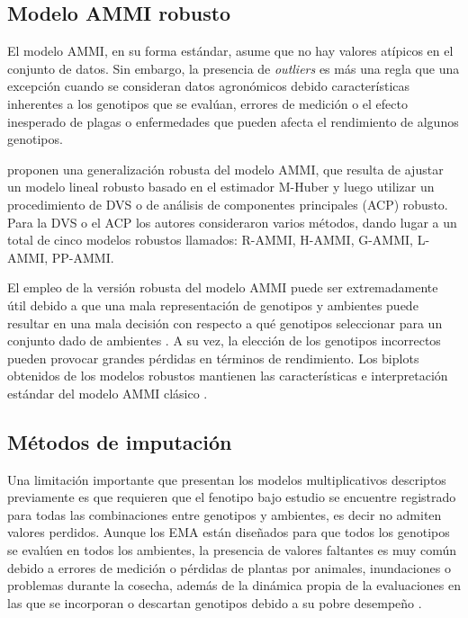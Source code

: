 \subsection{Modelo AMMI robusto}

El modelo AMMI, en su forma estándar, asume que no hay valores atípicos en el conjunto de datos. Sin embargo, la presencia de \emph{outliers} es más una regla que una excepción cuando se consideran datos agronómicos debido características inherentes a los genotipos que se evalúan, errores de medición o el efecto inesperado de plagas o enfermedades que pueden afecta el rendimiento de algunos genotipos.

\citet{Rodriguesetal2016} proponen una generalización robusta del modelo AMMI, que resulta de ajustar un modelo lineal robusto basado en el estimador M-Huber \citep{Huber1981} y luego utilizar un procedimiento de DVS o de análisis de componentes principales (ACP) robusto. Para la DVS o el ACP los autores consideraron varios métodos, dando lugar a un total de cinco modelos robustos llamados: R-AMMI, H-AMMI, G-AMMI, L-AMMI, PP-AMMI. 

El empleo de la versión robusta del modelo AMMI puede ser extremadamente útil debido a que una mala representación de genotipos y ambientes puede resultar en una mala decisión con respecto a qué genotipos seleccionar para un conjunto dado de ambientes \citep{GauchZobel1997, Yanetal2000}. A su vez, la elección de los genotipos incorrectos pueden provocar grandes pérdidas en términos de rendimiento. Los biplots obtenidos de los modelos robustos mantienen las características e interpretación estándar del modelo AMMI clásico \citep{Rodriguesetal2016}.


\subsection{Métodos de imputación}


Una limitación importante que presentan los modelos multiplicativos descriptos previamente es que requieren que el fenotipo bajo estudio se encuentre registrado para todas las combinaciones entre genotipos y ambientes, es decir no admiten valores perdidos. Aunque los EMA están diseñados para que todos los genotipos se evalúen en todos los ambientes, la presencia de valores faltantes es muy común debido a errores de medición o pérdidas de plantas por animales, inundaciones o problemas durante la cosecha, además de la dinámica propia de la evaluaciones en las que se incorporan o descartan genotipos debido a su pobre desempeño \citep{HillRosenberg1985}.

